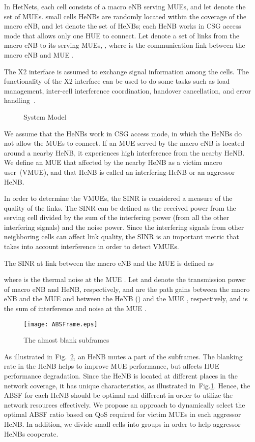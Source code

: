 \documentclass[paper]{ieice}
\begin{document}
In HetNets, each cell consists of a macro eNB serving  MUEs, and let  denote the set of MUEs.  small cells HeNBs are randomly located within the coverage of the  macro eNB, and let  denote the set of HeNBs; each HeNB  works in CSG access mode that allows only one HUE to connect. Let  denote a set of links from the macro eNB to its serving MUEs, , where  is the communication link between the  macro eNB and MUE .

The X2 interface is assumed to exchange signal information among the cells. The functionality of the X2 interface can be used to do some tasks such as load management, inter-cell interference coordination, handover cancellation, and error handling~\cite{X22011}.
\begin{figure}[t]
  \centering
\caption{System Model}\label{lb-Sys}
\end{figure}

We assume that the HeNBs work in CSG access mode, in which the HeNBs do not allow the MUEs to connect. If an MUE served by the macro eNB is located around a nearby HeNB, it experiences high interference from the nearby HeNB. We define an MUE that affected by the nearby HeNB as a victim macro user~(VMUE), and that HeNB is called an interfering HeNB or an aggressor HeNB.

In order to determine the VMUEs, the SINR is considered a measure of the quality of the links. The SINR can be defined as the received power from the serving cell divided by the sum of the interfering power (from all the other interfering signals) and the noise power. Since the interfering signals from other neighboring cells can affect link quality, the SINR is an important metric that takes into account interference in order to detect VMUEs.

The SINR  at link  between the  macro eNB and the MUE  is defined as
 
where  is the thermal noise at the MUE . Let  and  denote the transmission power of macro eNB and HeNB, respectively,  and  are the path gains between the  macro eNB and the MUE  and between the HeNB  () and the MUE , respectively, and  is the sum of interference and noise at the MUE .
\begin{figure}[t]
  \centering
\texttt{[image: ABSFrame.eps]}
  \caption{The almost blank subframes}\label{lb-absf}
\end{figure}

As illustrated in Fig.~\ref{lb-absf}, an HeNB mutes a part of the subframes. The blanking rate in the HeNB helps to improve MUE performance, but affects HUE performance degradation. Since the HeNB is located at different places in the network coverage, it has unique characteristics, as illustrated in~Fig.\ref{lb-Sys}. Hence, the ABSF for each HeNB should be optimal and different in order to utilize the network resources effectively. We propose an approach to dynamically select the optimal ABSF ratio based on QoS required for victim MUEs in each aggressor HeNB. In addition, we divide small cells into groups in order to help aggressor HeNBs cooperate.
\end{document}
